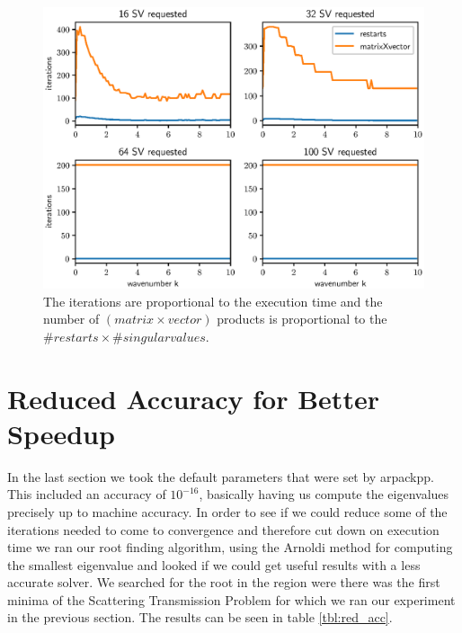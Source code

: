 \documentclass[a4paper, oneside]{thirdparty_stylesheets/discothesis}
\begin{document}
\begin{figure} [H]
	\centering
	\includegraphics[width=0.9\columnwidth]{figures/arnoldi_iter_1e-16_2.eps}
	\caption{
		The iterations are proportional to the execution time and the number of $(matrix\times vector)$ products is proportional to the $\#restarts \times \#singularvalues$.
	}
	\label{fig:arnoldi_iter_1e-16_2}
\end{figure}

\section{Reduced Accuracy for Better Speedup}
In the last section we took the default parameters that were set by arpackpp.
This included an accuracy of $10^{-16}$, basically having us compute the eigenvalues precisely up to machine accuracy.
In order to see if we could reduce some of the iterations needed to come to convergence and therefore cut down on execution time we ran our root finding algorithm, using the Arnoldi method for computing the smallest eigenvalue and looked if we could get useful results with a less accurate solver. 
We searched for the root in the region were there was the first minima of the Scattering Transmission Problem for which we ran our experiment in the previous section.
The results can be seen in table \ref{tbl:red_acc}.
\begin{table}[h!]
	\centering
	\caption{Change in singular values against change in grid size.}
	\label{tbl:red_acc}
\end{table}
\end{document}
